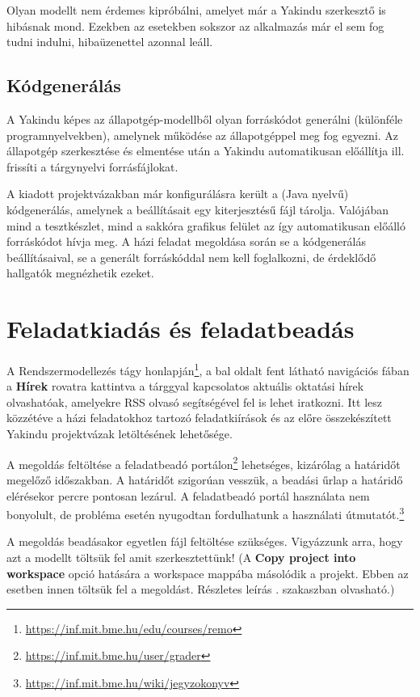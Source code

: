 \begin{megjegyzes}
	Olyan modellt nem érdemes kipróbálni, amelyet már a Yakindu szerkesztő is hibásnak mond. Ezekben az esetekben sokszor az alkalmazás már el sem fog tudni indulni, hibaüzenettel azonnal leáll.
\end{megjegyzes}

\subsection{Kódgenerálás}

A Yakindu képes az állapotgép-modellből olyan forráskódot generálni (különféle programnyelvekben), amelynek működése az állapotgéppel meg fog egyezni. Az állapotgép szerkesztése és elmentése után a Yakindu automatikusan előállítja ill. frissíti a tárgynyelvi forrásfájlokat.

A kiadott projektvázakban már konfigurálásra került a (Java nyelvű) kódgenerálás, amelynek a beállításait egy  kiterjesztésű fájl tárolja. Valójában mind a tesztkészlet, mind a sakkóra grafikus felület az így automatikusan előálló forráskódot hívja meg. A házi feladat megoldása során se a kódgenerálás beállításaival, se a generált forráskóddal nem kell foglalkozni, de érdeklődő hallgatók megnézhetik ezeket.

\section{Feladatkiadás és feladatbeadás}
\label{sec:feladatkiadas-es-feladatbeadas}

A Rendszermodellezés tágy honlapján\footnote{\url{https://inf.mit.bme.hu/edu/courses/remo}}, a bal oldalt fent látható navigációs fában a \textbf{Hírek} rovatra kattintva a tárggyal kapcsolatos aktuális oktatási hírek olvashatóak, amelyekre RSS olvasó segítségével fel is lehet iratkozni. Itt lesz közzétéve a házi feladatokhoz tartozó feladatkiírások és az előre összekészített Yakindu projektvázak letöltésének lehetősége.

A megoldás feltöltése a feladatbeadó portálon\footnote{\url{https://inf.mit.bme.hu/user/grader}} lehetséges, kizárólag a határidőt megelőző időszakban. A határidőt szigorúan vesszük, a beadási űrlap a határidő elérésekor percre pontosan lezárul. A feladatbeadó portál használata nem bonyolult, de probléma esetén nyugodtan fordulhatunk a használati útmutatót.\footnote{\url{https://inf.mit.bme.hu/wiki/jegyzokonyv}}

\begin{figyelmeztetes}
A megoldás beadásakor egyetlen  fájl feltöltése szükséges.
Vigyázzunk arra, hogy azt a modellt töltsük fel amit szerkesztettünk! (A \textbf{Copy project into workspace} opció hatására a workspace mappába másolódik a projekt. Ebben az esetben innen töltsük fel a megoldást. Részletes leírás . szakaszban olvasható.)
\end{figyelmeztetes}

